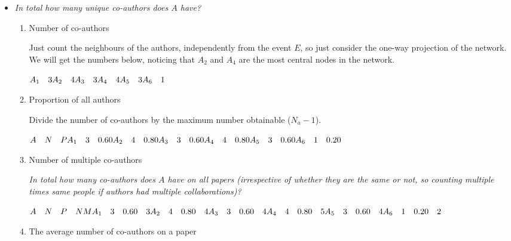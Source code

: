 \documentclass[
  notitlepage,
  onecolumn,
  openany]{book}
\providecommand{\tightlist}{%
  \setlength{\itemsep}{0pt}\setlength{\parskip}{0pt}}
\begin{document}
\begin{itemize}
\tightlist
\item
  \emph{In total how many unique co-authors does \(A\) have?}

  \begin{enumerate}
  \def\labelenumi{\arabic{enumi}.}
  \item
    Number of co-authors

    Just count the neighbours of the authors, independently from the event \(E\), so just consider the one-way projection of the network. We will get the numbers below, noticing that \(A_2\) and \(A_4\) are the most central nodes in the network.

    \(A_1 \quad 3\\  A_2 \quad 4\\  A_3 \quad 3\\  A_4 \quad 4\\  A_5 \quad 3\\  A_6 \quad 1\)
  \item
    Proportion of all authors

    Divide the number of co-authors by the maximum number obtainable (\(N_a -1\)).

    \(A \quad N\quad P\\  A_1 \quad 3 \quad 0.60\\  A_2 \quad 4 \quad 0.80\\  A_3 \quad 3\quad 0.60\\  A_4 \quad 4\quad 0.80\\  A_5 \quad 3\quad 0.60\\  A_6 \quad 1 \quad 0.20\)
  \item
    Number of multiple co-authors

    \emph{In total how many co-authors does \(A\) have on all papers (irrespective of whether they are the same or not, so counting multiple times same people if authors had multiple collaborations)?}

    \(A \quad N\quad P \quad NM\\  A_1 \quad 3 \quad 0.60\quad 3\\  A_2 \quad 4 \quad 0.80\quad 4\\  A_3 \quad 3\quad 0.60\quad 4\\  A_4 \quad 4\quad 0.80\quad 5\\  A_5 \quad 3\quad 0.60\quad 4\\  A_6 \quad 1 \quad 0.20\quad 2\)
  \item
    The average number of co-authors on a paper


\end{enumerate}
\end{itemize}
\end{document}
